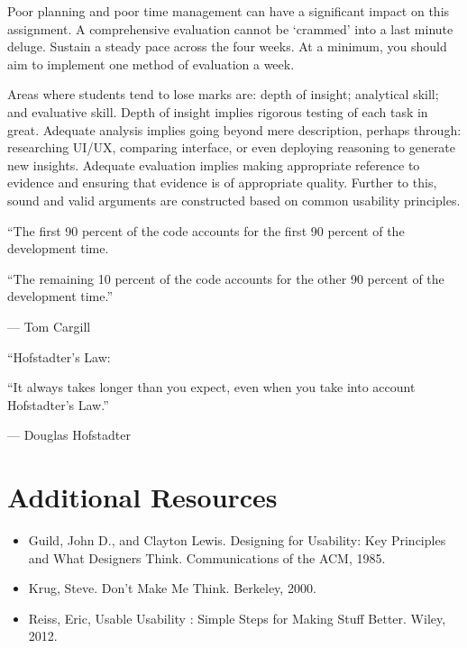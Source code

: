 \documentclass{../fal_assignment}
\begin{document}
Poor planning and poor time management can have a significant impact on this assignment. A comprehensive evaluation cannot be `crammed' into a last minute deluge. Sustain a steady pace across the four weeks. At a minimum, you should aim to implement one method of evaluation a week.

Areas where students tend to lose marks are: depth of insight; analytical skill; and evaluative skill. Depth of insight implies rigorous testing of each task in great. Adequate analysis implies going beyond mere description, perhaps through: researching UI/UX, comparing interface, or even deploying reasoning to generate new insights. Adequate evaluation implies making appropriate reference to evidence and ensuring that evidence is of appropriate quality. Further to this, sound and valid arguments are constructed based on common usability principles. 

\begin{marginquote}
    ``The first 90 percent of the code accounts for the first 90 percent of the development time.
    
    ``The remaining 10 percent of the code accounts for the other 90 percent of the development time.''
    
    --- Tom Cargill
    
    \marginquoterule
    
    ``Hofstadter's Law:
    
    ``It always takes longer than you expect, even when you take into account Hofstadter's Law.''
    
    --- Douglas Hofstadter
\end{marginquote}

\section*{Additional Resources}

\begin{itemize}
    \item Guild, John D., and Clayton Lewis. Designing for Usability: Key Principles and What Designers Think. Communications of the ACM, 1985.
    \item Krug, Steve. Don't Make Me Think. Berkeley, 2000. 
    \item Reiss, Eric, Usable Usability : Simple Steps for Making Stuff Better. Wiley, 2012.
\end{itemize}
\end{document}
